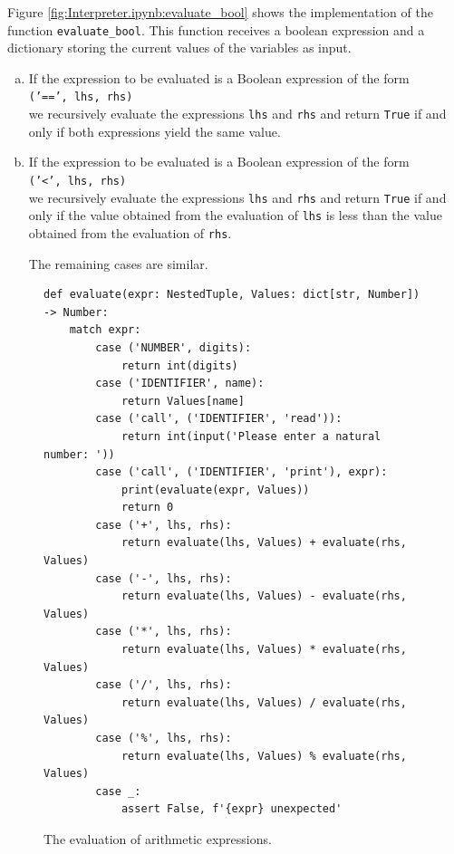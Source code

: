 Figure \ref{fig:Interpreter.ipynb:evaluate_bool} shows the implementation of the function \texttt{evaluate\_bool}.
This function receives a boolean expression and a dictionary storing the current values of the variables as input.
\begin{enumerate}[(a)]
\item If the expression to be evaluated is a Boolean expression of the form
      \\[0.2cm]
      \hspace*{1.3cm}
      \texttt{('==', lhs, rhs)}
      \\[0.2cm]
      we recursively evaluate the expressions \texttt{lhs} and \texttt{rhs} and return \texttt{True} if and only if
      both expressions yield the same value.
\item If the expression to be evaluated is a Boolean expression of the form
      \\[0.2cm]
      \hspace*{1.3cm}
      \texttt{('<', lhs, rhs)}
      \\[0.2cm]
      we recursively evaluate the expressions \texttt{lhs} and \texttt{rhs} and return \texttt{True} if and only if
      the value obtained from the evaluation of \texttt{lhs} is less than the
      value obtained from the evaluation of \texttt{rhs}.

      The remaining cases are similar.
\end{enumerate}

\begin{figure}[!ht]
\centering
\begin{verbatim}
def evaluate(expr: NestedTuple, Values: dict[str, Number]) -> Number:
    match expr:
        case ('NUMBER', digits):
            return int(digits)
        case ('IDENTIFIER', name):
            return Values[name]
        case ('call', ('IDENTIFIER', 'read')):
            return int(input('Please enter a natural number: '))
        case ('call', ('IDENTIFIER', 'print'), expr):
            print(evaluate(expr, Values))
            return 0
        case ('+', lhs, rhs):
            return evaluate(lhs, Values) + evaluate(rhs, Values)
        case ('-', lhs, rhs):
            return evaluate(lhs, Values) - evaluate(rhs, Values)
        case ('*', lhs, rhs):
            return evaluate(lhs, Values) * evaluate(rhs, Values)
        case ('/', lhs, rhs):
            return evaluate(lhs, Values) / evaluate(rhs, Values)
        case ('%', lhs, rhs):
            return evaluate(lhs, Values) % evaluate(rhs, Values)
        case _:
            assert False, f'{expr} unexpected'
\end{verbatim}
\vspace*{-0.3cm}
\caption{The evaluation of arithmetic expressions.}
\label{fig:Interpreter.ipynb:evaluate}
\end{figure}

